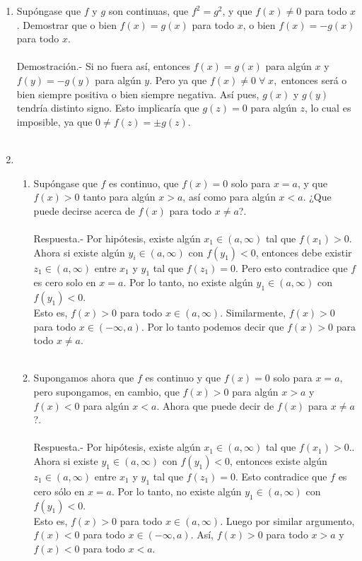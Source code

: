 \begin{enumerate}[\bfseries 1.]
\item Supóngase que $f$ y $g$ son continuas, que $f^2=g^2$, y que $f(x)\neq 0$ para todo $x$. Demostrar que o bien $f(x)=g(x)$ para todo $x$, o bien $f(x)=-g(x)$ para todo $x$.\\\\
    Demostración.-\; Si no fuera así, entonces $f(x)=g(x)$ para algún $x$ y $f(y)=-g(y)$ para algún $y$. Pero ya que $f(x)\neq 0 \; \forall \;x,$ entonces será o bien siempre positiva o bien siempre negativa. Así pues, $g(x)$ y $g(y)$ tendría distinto signo. Esto implicaría que $g(z)=0$ para algún $z$, lo cual es imposible, ya que $0\neq f(z) = \pm g(z).$\\\\

\item 
    \begin{enumerate}[\bfseries (a)]

	\item Supóngase que $f$ es continuo, que $f(x)=0$ solo para $x=a$, y que $f(x)>0$ tanto para algún $x>a$, así como para algún $x<a$. ¿Que puede decirse acerca de $f(x)$ para todo $x\neq a$?.\\\\ 
	    Respuesta.-\; Por hipótesis, existe algún $x_1\in (a,\infty)$ tal que $f(x_1)>0$. Ahora si existe algún $y_i\in (a,\infty)$ con $f(y_1)<0$, entonces debe existir $z_1\in (a,\infty)$ entre $x_1$ y $y_1$ tal que $f(z_1)=0$. Pero esto contradice  que $f$ es cero solo en $x=a$. Por lo tanto, no existe algún $y_1\in (a,\infty)$ con $f(y_1)<0$.\\
	    Esto es, $f(x)>0$ para todo  $x\in(a,\infty).$ Similarmente, $f(x)>0$ para todo  $x\in(-\infty,a).$ Por lo tanto podemos decir que $f(x)>0$ para todo $x\neq a$.\\\\

	\item Supongamos ahora que $f$ es continuo y que $f(x)=0$ solo para $x=a$, pero supongamos, en cambio, que $f(x)>0$ para algún $x>a$ y $f(x)<0$ para algún $x<a$. Ahora que puede decir de $f(x)$ para $x\neq a$?.\\\\
	    Respuesta.-\; Por hipótesis, existe algún $x_1\in (a,\infty)$ tal que $f(x_1)>0.$. Ahora si existe $y_1\in (a,\infty)$ con $f(y_1)<0$, entonces existe algún $z_1\in (a,\infty)$ entre $x_1$ y $y_1$ tal que $f(z_1)=0.$ Esto contradice que $f$ es cero sólo en $x=a$. Por lo tanto, no existe algún $y_1\in (a,\infty)$ con $f(y_1)<0.$\\
	    Esto es, $f(x)>0$ para todo $x\in (a,\infty).$ Luego por similar argumento, $f(x)<0$ para todo $x\in (-\infty,a)$. Así, $f(x)>0$ para todo $x>a$ y $f(x)<0$ para todo $x<a$.\\\\


\end{enumerate}
\end{enumerate}

